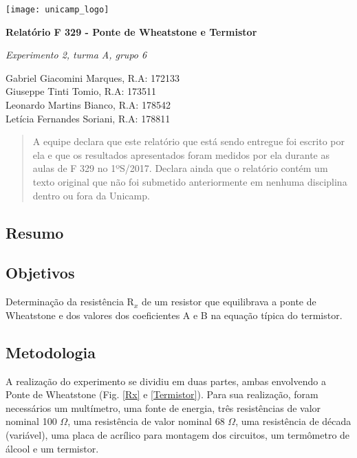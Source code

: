 \documentclass[12pt]{article}
\begin{document}
    \hfill \texttt{[image: unicamp\_logo]} %
    
    \begin{center}
        \textbf{\Large
            Relatório F 329 - Ponte de Wheatstone e Termistor
        }%
        
        \textit{Experimento 2, turma A, grupo 6}
    
        Gabriel Giacomini Marques, R.A: 172133 \\
        Giuseppe Tinti Tomio, R.A: 173511 \\
        Leonardo Martins Bianco, R.A: 178542 \\
        Letícia Fernandes Soriani, R.A: 178811
    \end{center}
    
    
    \def\abstractname{Afirmação de Honestidade} %
    \begin{abstract}
        A equipe declara que este relatório que está sendo entregue foi escrito por ela e que os resultados apresentados foram medidos por ela durante as aulas de F 329 no 1ºS/2017. Declara ainda que o relatório contém um texto original que não foi submetido anteriormente em nenhuma disciplina dentro ou fora da Unicamp.
    \end{abstract}

    
    \subsection*{Resumo}
        
    
    \subsection*{Objetivos}
       
    Determinação da resistência R$_x$ de um resistor que equilibrava a ponte de Wheatstone e dos valores dos coeficientes A e B na equação típica do termistor.
    
    \subsection*{Metodologia}    
    
    A realização do experimento se dividiu em duas partes, ambas envolvendo a Ponte de Wheatstone (Fig. \ref{Rx} e \ref{Termistor}). Para sua realização, foram necessários um multímetro, uma fonte de energia, três resistências de valor nominal 100 $\Omega$, uma resistência de valor nominal 68 $\Omega$, uma resistência de década (variável), uma placa de acrílico para montagem dos circuitos, um termômetro de álcool e um termistor.
    
\end{document}
